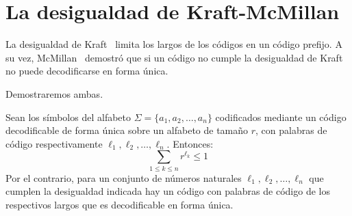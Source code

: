 \section{La desigualdad de Kraft-McMillan}
\label{sec:Kraft-McMillan}

  La desigualdad de Kraft~%
    \cite{kraft49:_coding}
  limita los largos de los códigos en un código prefijo.
  A su vez,
  McMillan~%
    \cite{mcmillan56:_two_inequalities}
  demostró que si un código no cumple la desigualdad de Kraft
  no puede decodificarse en forma única.

  Demostraremos ambas.
  \begin{theorem}
    Sean los símbolos del alfabeto \(\Sigma = \{a_1, a_2, \dotsc, a_n\}\)
    codificados mediante un código decodificable de forma única
    sobre un alfabeto de tamaño \(r\),
    con palabras de código respectivamente \(\ell_1, \ell_2, \ldots, \ell_n\).
    Entonces:
    \begin{equation}
      \label{eq:Kraft-inequality}
      \sum_{1 \le k \le n} r^{\ell_k}
        \le 1
    \end{equation}
    Por el contrario,
    para un conjunto de números naturales \(\ell_1, \ell_2, \ldots, \ell_n\)
    que cumplen la desigualdad indicada hay un código con  palabras de código
    de los respectivos largos que es decodificable en forma única.
  \end{theorem}
